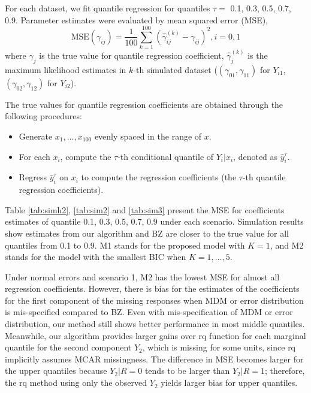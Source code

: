 \documentclass[useAMS,usenatbib,referee]{biom}
\begin{document}
For each dataset, we fit quantile regression for quantiles $\tau =$ 0.1, 0.3, 0.5, 0.7, 0.9.
Parameter estimates were evaluated by mean squared error (MSE),
\begin{displaymath}
  \mbox{MSE} (\gamma_{ij}) = \frac{1}{100} \sum_{k = 1}^{100}
  \left( \hat{\gamma}_{ij}^{(k)}  - \gamma_{ij}\right)^2, i = 0, 1
\end{displaymath}
where $\gamma_{j}$ is the true value for quantile regression
coefficient, $\hat{\gamma}_{j}^{(k)}$ is the maximum likelihood
estimates in $k$-th simulated dataset ($(\gamma_{01}, \gamma_{11})$
for $Y_{i1}$, $(\gamma_{02}, \gamma_{12})$ for $Y_{i2}$).

The true values for quantile regression coefficients are obtained through the following procedures:
\begin{itemize}
\item Generate $x_1, \ldots, x_{100}$ evenly spaced in the range of $x$.
\item For each $x_i$, compute the $\tau$-th conditional quantile of $Y_i | x_i$, denoted as $\hat{y}_i^{\tau}$.
\item Regress $\hat{y}_i^{\tau}$ on $x_i$ to compute the regression coefficients (the $\tau$-th quantile regression coefficients).
\end{itemize}


Table \ref{tab:simh2}, \ref{tab:sim2} and \ref{tab:sim3} present the MSE for coefficients estimates of quantile 0.1, 0.3, 0.5, 0.7, 0.9 under each scenario.
Simulation results show estimates from our algorithm and BZ are closer to the true value for all quantiles from 0.1 to 0.9.
M1 stands for the proposed model with $K = 1$, and M2 stands for the model with the smallest BIC when $K = 1, \ldots, 5$.

Under normal errors and scenario 1, M2 has the lowest MSE for almost all regression coefficients.
However, there is bias for the estimates of the coefficients for the first component of the missing responses when MDM or error distribution is mis-specified compared to BZ.
Even with mis-specification of MDM or error distribution, our method still shows better performance in most middle quantiles.
Meanwhile, our algorithm provides larger gains over rq function for each
marginal quantile for the second component $Y_2$, which is missing for some units,
since rq implicitly assumes MCAR missingness.
The difference in MSE becomes larger for the upper quantiles because $Y_2 |R = 0$ tends to be larger than $Y_2 | R = 1$;
therefore, the rq method using only the observed $Y_2$ yields larger bias for upper quantiles.
\end{document}
